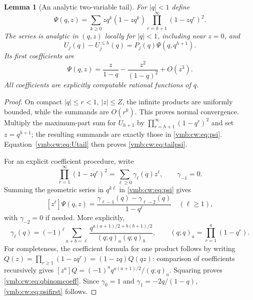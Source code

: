 \documentclass[11pt,a4paper]{article}
\numberwithin{equation}{section}
\newtheorem{lemma}[theorem]{Lemma}
\theoremstyle{definition}\newtheorem{definition}[theorem]{Definition}
\theoremstyle{remark}\newtheorem{remark}[theorem]{Remark}
\begin{document}
\begin{lemma}[An analytic two-variable tail]\label{vmb:cw:lem:psi}
For $|q|<1$ define
\begin{equation}\label{vmb:cw:eq:psi}
 \Psi(q,z)=\sum_{k\ge0}zq^k(1-zq^k)
                 \prod_{r=k+1}^{\infty}(1-zq^r)^2.
\end{equation}
The series is analytic in $(q,z)$ locally for $|q|<1$, including near $z=0$,
and
\begin{equation}\label{vmb:cw:eq:tailpsi}
 U_j(q)-U_j^{\le h}(q)=P_j(q)\Psi(q,q^{h+1}).
\end{equation}
Its first coefficients are
\begin{equation}\label{vmb:cw:eq:psifirst}
 \Psi(q,z)=\frac z{1-q}-\frac{z^2}{(1-q)^2}+O(z^3).
\end{equation}
All coefficients are explicitly computable rational functions of $q$.
\end{lemma}
\begin{proof}
On compact $|q|\le r<1$, $|z|\le Z$, the infinite products are uniformly
bounded, while the summands are $O(r^k)$. This proves normal convergence.
Multiply the maximum-part sum for $U_{h+1}$ by
$\prod_{r=h+1}^\infty(1-q^r)^2$ and set $z=q^{h+1}$; the resulting
summands are exactly those in \eqref{vmb:cw:eq:psi}. Equation~\eqref{vmb:cw:eq:Utail}
then proves \eqref{vmb:cw:eq:tailpsi}.

For an explicit coefficient procedure, write
\[
 \prod_{r=1}^\infty(1-zq^r)^2=\sum_{\ell\ge0}\gamma_\ell(q)z^\ell,
 \qquad \gamma_{-1}=0.
\]
Summing the geometric series in $q^{k\ell}$ in \eqref{vmb:cw:eq:psi} gives
\begin{equation}\label{vmb:cw:eq:psicoeff}
 [z^\ell]\Psi(q,z)=\frac{\gamma_{\ell-1}(q)-\gamma_{\ell-2}(q)}{1-q^\ell}
 \quad(\ell\ge1),
\end{equation}
with $\gamma_{-2}=0$ if needed. More explicitly,
\begin{equation}\label{vmb:cw:eq:qbinomcoeff}
 \gamma_\ell(q)=(-1)^\ell\sum_{a+b=\ell}
 \frac{q^{a(a+1)/2+b(b+1)/2}}
 {(q;q)_a(q;q)_b},\qquad
 (q;q)_a=\prod_{r=1}^a(1-q^r).
\end{equation}
For completeness, the coefficient formula for one product follows by
writing $Q(z)=\prod_{r\ge1}(1-zq^r)=(1-zq)Q(qz)$: comparison of coefficients
recursively gives $[z^a]Q=(-1)^aq^{a(a+1)/2}/(q;q)_a$. Squaring proves
\eqref{vmb:cw:eq:qbinomcoeff}. Since $\gamma_0=1$ and $\gamma_1=-2q/(1-q)$,
\eqref{vmb:cw:eq:psifirst} follows.
\end{proof}
\end{document}
